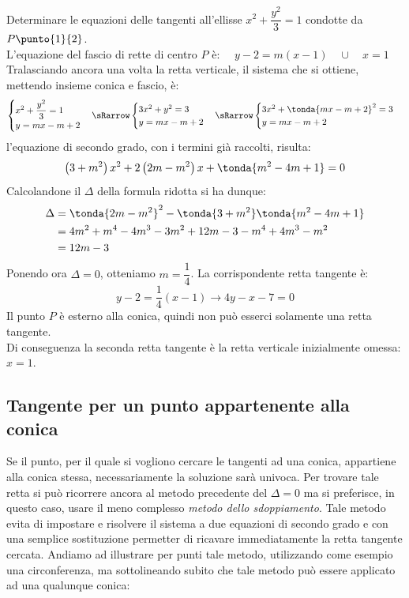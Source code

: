 \begin{esempio} Determinare le equazioni delle tangenti 
all'ellisse \(x^{2} + \dfrac{y^{2}}{3} =1\) condotte da 
\(P\punto{1}{2}\).\\[7pt]
L'equazione del fascio di rette di centro $P$ è:  \(\quad y-2=m(x-1)\quad \cup \quad x=1\)\\[3pt]
Tralasciando ancora una volta la retta verticale, il sistema che si ottiene, mettendo insieme conica e fascio, è:
\[\begin{cases}  x^{2}+\dfrac{y^{2}}{3}=1   \\ y=mx-m+2  
\end{cases} \sRarrow  
\begin{cases}  3x^{2}+y^{2}=3   \\ y=mx-m+2  
\end{cases} \sRarrow 
\begin{cases}  3x^{2}+\tonda{mx-m+2}^2=3   \\ y=mx-m+2  
\end{cases}\]
l'equazione di secondo grado, con i termini già raccolti, risulta: 
\[\left(3+ m^{2} \right) x^{2} +2\left(2m-m^{2} \right)x+ \tonda{m^{2} -4m+1}=0\]
Calcolandone il $\Delta$ della formula ridotta si ha dunque:
\[\begin{split}
\Delta & = \tonda{2m-m^{2}}^2 -\tonda{3+ m^{2}}\tonda{m^{2}-4m+1} \\
 & =4 m^{2} + m^{4} -4 m^{3} -3 m^{2} +12m-3- m^{4} +4 m^{3} - m^{2} \\&=12m-3
\end{split}\]
Ponendo ora $\Delta =0$, otteniamo $m=\dfrac{1}{4}$. La corrispondente retta tangente è:
\[y-2=\dfrac{1}{4}(x-1) \longrightarrow  4y-x-7=0\]
Il punto $P$ è esterno alla conica, quindi non può esserci solamente una retta tangente.\\
Di conseguenza la seconda retta tangente è la retta verticale inizialmente omessa: \(x=1\).
\end{esempio}

\subsection{Tangente per un punto appartenente alla conica}

Se il punto, per il quale si vogliono cercare le tangenti ad una conica, 
appartiene alla conica stessa, necessariamente la soluzione sarà univoca. 
Per trovare tale retta si può ricorrere ancora al metodo precedente del $ \Delta =0$ ma si 
preferisce, in questo caso, usare il meno complesso \emph{metodo dello 
sdoppiamento}. Tale metodo evita di impostare e risolvere il sistema a due 
equazioni di secondo grado e con una semplice sostituzione permetter di ricavare 
immediatamente la retta tangente cercata.
Andiamo ad illustrare per punti tale metodo, utilizzando come esempio una circonferenza,
ma sottolineando subito che tale metodo può essere applicato ad una qualunque conica:

